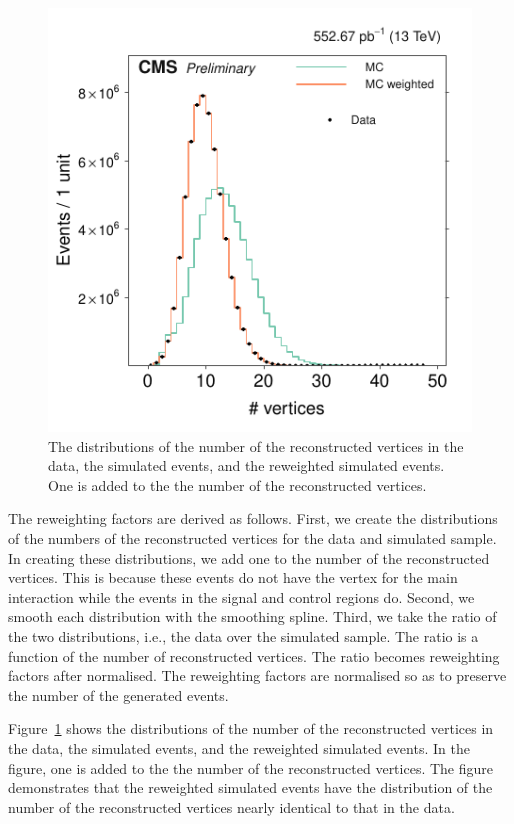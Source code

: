 \begin{figure}[!b]
\centering
\includegraphics[scale=1.00]{figures/pileup_reweighting/f042_corr_nVert_data_mc_norm}
\caption{The distributions of the number of the reconstructed vertices
in the data, the simulated events, and the reweighted simulated events.
One is added to the the number of the reconstructed vertices.}
\label{f042_corr_nVert_data_mc_norm}
\end{figure}

The reweighting factors are derived as follows. First, we create the
distributions of the numbers of the reconstructed vertices for the data
and simulated sample. In creating these distributions, we add one to the
number of the reconstructed vertices. This is because these events do
not have the vertex for the main interaction while the events in the
signal and control regions do. Second, we smooth each distribution with
the smoothing spline. Third, we take the ratio of the two distributions,
i.e., the data over the simulated sample. The ratio is a function of the
number of reconstructed vertices. The ratio becomes reweighting factors
after normalised. The reweighting factors are normalised so as to
preserve the number of the generated events.

Figure~\ref{f042_corr_nVert_data_mc_norm} shows the distributions of the
number of the reconstructed vertices in the data, the simulated events,
and the reweighted simulated events. In the figure, one is added to the
the number of the reconstructed vertices. The figure demonstrates that
the reweighted simulated events have the distribution of the number of
the reconstructed vertices nearly identical to that in the data.


